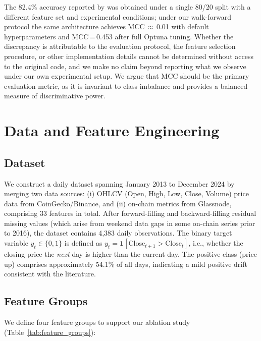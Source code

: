 \documentclass[final,3p,times,authoryear]{elsarticle}
\begin{document}
The 82.4\% accuracy reported by \citet{omole2024financial} was obtained
under a single 80/20 split with a different feature set and experimental
conditions; under our walk-forward protocol the same architecture achieves
MCC\,$\approx$\,0.01 with default hyperparameters and MCC\,=\,0.453 after
full Optuna tuning.
Whether the discrepancy is attributable to the evaluation protocol, the
feature selection procedure, or other implementation details cannot be
determined without access to the original code, and we make no claim
beyond reporting what we observe under our own experimental setup.
We argue that MCC \citep{chicco2020mcc} should be the primary evaluation
metric, as it is invariant to class imbalance and provides a balanced
measure of discriminative power.

\section{Data and Feature Engineering}
\label{sec:data}

\subsection{Dataset}

We construct a daily dataset spanning January 2013 to December 2024 by
merging two data sources:
(i) OHLCV (Open, High, Low, Close, Volume) price data from
CoinGecko/Binance, and (ii) on-chain metrics from Glassnode, comprising
33 features in total.
After forward-filling and backward-filling residual missing values (which
arise from weekend data gaps in some on-chain series prior to 2016), the
dataset contains 4{,}383 daily observations.
The binary target variable $y_t \in \{0,1\}$ is defined as
$y_t = \mathbf{1}[\text{Close}_{t+1} > \text{Close}_t]$, i.e., whether
the closing price the \emph{next} day is higher than the current day.
The positive class (price up) comprises approximately 54.1\% of all days,
indicating a mild positive drift consistent with the literature.

\subsection{Feature Groups}

We define four feature groups to support our ablation study
(Table~\ref{tab:feature_groups}):
\end{document}

